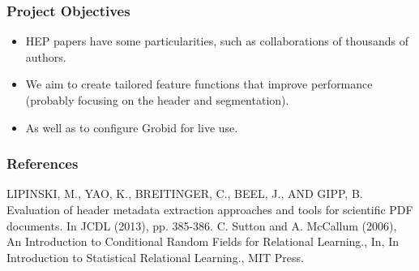 \documentclass{beamer}
\begin{document}

\begin{frame}
\frametitle{Project Objectives}
\begin{itemize}
\item HEP papers have some particularities, such as collaborations of thousands of authors.
\item We aim to create tailored feature functions that improve performance (probably focusing on the header and segmentation).
\item As well as to configure Grobid for live use.
\end{itemize}
\end{frame}


\begin{frame}
\frametitle{References}

\begin{thebibliography}{0}

 LIPINSKI, M., YAO, K., BREITINGER, C., BEEL, J., AND GIPP, B. Evaluation of header metadata extraction approaches and tools for scientific PDF documents. In JCDL (2013), pp. 385-386.
 C. Sutton and A. McCallum (2006), An Introduction to Conditional Random Fields for Relational Learning., In, In Introduction to Statistical Relational Learning., MIT Press.

\end{thebibliography}

\end{frame}
\end{document}
